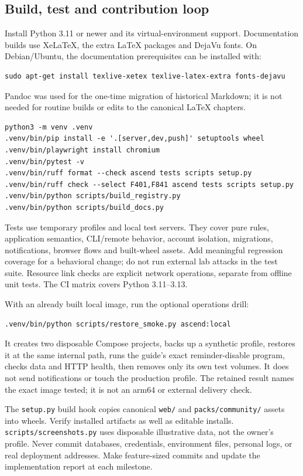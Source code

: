 \subsection{Build, test and contribution loop}
Install Python 3.11 or newer and its virtual-environment support. Documentation
builds use XeLaTeX, the extra LaTeX packages and DejaVu fonts. On Debian/Ubuntu,
the documentation prerequisites can be installed with:
\begin{verbatim}
sudo apt-get install texlive-xetex texlive-latex-extra fonts-dejavu
\end{verbatim}
Pandoc was used for the one-time migration of historical Markdown; it is not
needed for routine builds or edits to the canonical LaTeX chapters.
\begin{verbatim}
python3 -m venv .venv
.venv/bin/pip install -e '.[server,dev,push]' setuptools wheel
.venv/bin/playwright install chromium
.venv/bin/pytest -v
.venv/bin/ruff format --check ascend tests scripts setup.py
.venv/bin/ruff check --select F401,F841 ascend tests scripts setup.py
.venv/bin/python scripts/build_registry.py
.venv/bin/python scripts/build_docs.py
\end{verbatim}
Tests use temporary profiles and local test servers. They cover pure rules,
application semantics, CLI/remote behavior, account isolation, migrations,
notifications, browser flows and built-wheel assets. Add meaningful regression
coverage for a behavioral change; do not run external lab attacks in the test
suite. Resource link checks are explicit network operations, separate from offline
unit tests. The CI matrix covers Python 3.11--3.13.

With an already built local image, run the optional operations drill:
\begin{verbatim}
.venv/bin/python scripts/restore_smoke.py ascend:local
\end{verbatim}
It creates two disposable Compose projects, backs up a synthetic profile, restores
it at the same internal path, runs the guide's exact reminder-disable program,
checks data and HTTP health, then removes only its own test volumes. It does not
send notifications or touch the production profile. The retained result names
the exact image tested; it is not an arm64 or external delivery check.

The \texttt{setup.py} build hook copies canonical \texttt{web/} and
\texttt{packs/community/} assets into wheels. Verify installed artifacts as well
as editable installs. \texttt{scripts/screenshots.py} uses disposable illustrative
data, not the owner's profile. Never commit databases, credentials, environment
files, personal logs, or real deployment addresses. Make feature-sized commits
and update the implementation report at each milestone.

